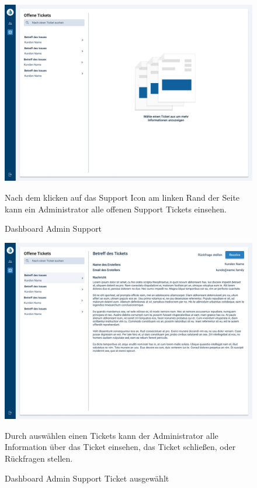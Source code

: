 \newpage

\begin{figure}[h]
	\centering
    \includegraphics[scale=0.3]{img/WebsiteMockup/Dashboard-Admin-Support}
	\caption{Dashboard Admin Support} \hfill \break
	Nach dem klicken auf das Support Icon am linken Rand der Seite kann ein Administrator alle offenen Support Tickets einsehen.
\end{figure}

\newpage

\begin{figure}[h]
	\centering
    \includegraphics[scale=0.3]{img/WebsiteMockup/Dashboard-Admin-Support-Selected}
	\caption{Dashboard Admin Support Ticket ausgewählt} \hfill \break
	Durch auswählen einen Tickets kann der Administrator alle Information über das Ticket einsehen, das Ticket schließen, oder Rückfragen stellen.
\end{figure}

